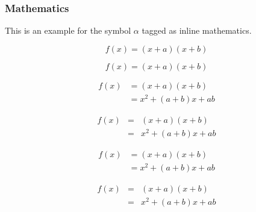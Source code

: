 \documentclass[preprint,5p,times,twocolumn,authoryear]{elsarticle}
\begin{document}
\subsubsection{Mathematics}
This is an example for the symbol $\alpha$ tagged as inline mathematics.

\begin{equation}
f(x) = (x+a)(x+b)
\end{equation}

\begin{equation*}
f(x) = (x+a)(x+b)
\end{equation*}

\begin{align}
 f(x) &= (x+a)(x+b) \\
      &= x^2 + (a+b)x + ab
\end{align}

\begin{eqnarray}
 f(x) &=& (x+a)(x+b) \nonumber\\ %
      &=& x^2 + (a+b)x + ab
\end{eqnarray}

\begin{align*}
 f(x) &= (x+a)(x+b) \\
      &= x^2 + (a+b)x + ab
\end{align*}

\begin{eqnarray*}
 f(x)&=& (x+a)(x+b) \\
     &=& x^2 + (a+b)x + ab
\end{eqnarray*}

\end{document}
